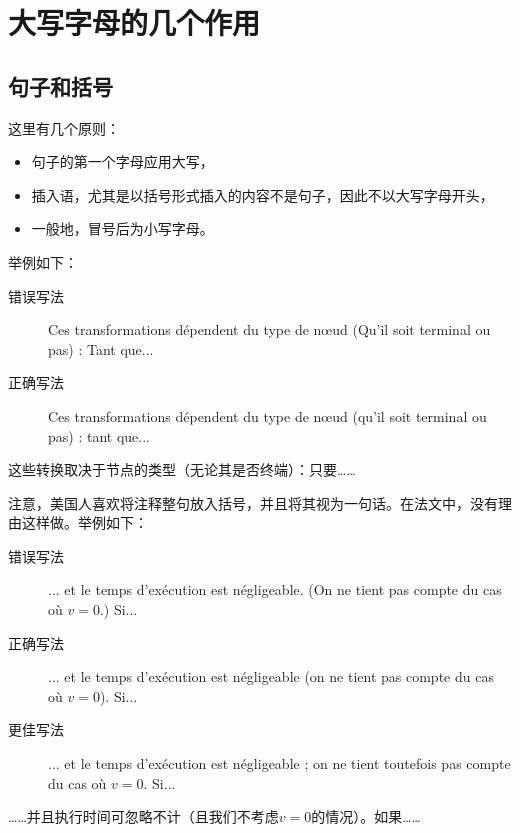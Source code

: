 \section{大写字母的几个作用}

\subsection{句子和括号}

这里有几个原则：

\begin{itemize}
    \item 句子的第一个字母应用大写，
    \item 插入语，尤其是以括号形式插入的内容不是句子，因此不以大写字母开头，
    \item 一般地，冒号后为小写字母。
\end{itemize}

举例如下：

\begin{description}
    \item[错误写法]  Ces transformations dépendent du type de nœud (Qu'il soit terminal ou pas) : Tant que...
    \item[正确写法] Ces transformations dépendent du type de nœud (qu'il soit terminal ou pas) : tant que...
\end{description}

\begin{bil}
    这些转换取决于节点的类型（无论其是否终端）：只要……
\end{bil}

注意，美国人喜欢将注释整句放入括号，并且将其视为一句话。在法文中，没有理由这样做。举例如下：

\begin{description}
    \item[错误写法] ... et le temps d'exécution est négligeable. (On ne tient pas compte du cas où $v = 0$.) Si...
    \item[正确写法]  ... et le temps d'exécution est négligeable (on ne tient pas compte du cas où $v = 0$). Si...
    \item[更佳写法] ... et le temps d'exécution est négligeable ; on ne tient toutefois pas compte du cas où $v = 0$. Si...
\end{description}

\begin{bil}
    ……并且执行时间可忽略不计（且我们不考虑$v = 0$的情况）。如果……
\end{bil}

